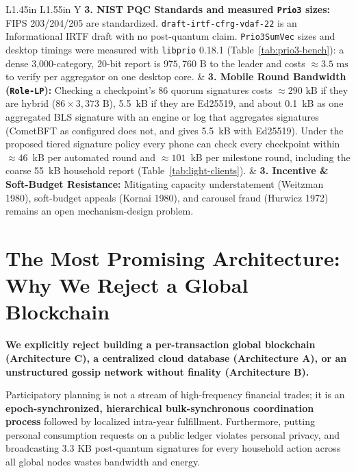 \documentclass[10pt,twoside,openany]{book}
\theoremstyle{dpepstyle}
\begin{document}
\begin{table}[htbp]
\begin{tabularx}{\textwidth}{L{1.45in} L{1.55in} Y}
\addlinespace[4pt]
\textbf{3. NIST PQC Standards and measured \texttt{Prio3} sizes:} FIPS 203/204/205 are standardized. \texttt{draft-irtf-cfrg-vdaf-22} is an Informational IRTF draft with no post-quantum claim. \texttt{Prio3SumVec} sizes and desktop timings were measured with \texttt{libprio} 0.18.1 (Table~\ref{tab:prio3-bench}): a dense 3,000-category, 20-bit report is $975{,}760\text{ B}$ to the leader and costs $\approx 3.5\text{ ms}$ to verify per aggregator on one desktop core. & \textbf{3. Mobile Round Bandwidth (\texttt{Role-LP}):} Checking a checkpoint's 86 quorum signatures costs $\approx 290\text{ kB}$ if they are hybrid ($86 \times 3{,}373\text{ B}$), 5.5~kB if they are Ed25519, and about 0.1~kB as one aggregated BLS signature with an engine or log that aggregates signatures (CometBFT as configured does not, and gives 5.5~kB with Ed25519). Under the proposed tiered signature policy every phone can check every checkpoint within $\approx 46$~kB per automated round and $\approx 101$~kB per milestone round, including the coarse 55~kB household report (Table~\ref{tab:light-clients}). & \textbf{3. Incentive \& Soft-Budget Resistance:} Mitigating capacity understatement (Weitzman 1980), soft-budget appeals (Kornai 1980), and carousel fraud (Hurwicz 1972) remains an open mechanism-design problem.\footnotemark \\
\bottomrule
\end{tabularx}
\end{table}
\addtocounter{footnote}{-1}

\section{The Most Promising Architecture: Why We Reject a Global Blockchain}
\label{sec:architecture-choice}

\textbf{We explicitly reject building a per-transaction global blockchain (Architecture C), a centralized cloud database (Architecture A), or an unstructured gossip network without finality (Architecture B).}

Participatory planning is not a stream of high-frequency financial trades; it is an \textbf{epoch-synchronized, hierarchical bulk-synchronous coordination process} followed by localized intra-year fulfillment. Furthermore, putting personal consumption requests on a public ledger violates personal privacy, and broadcasting $3.3\text{ KB}$ post-quantum signatures for every household action across all global nodes wastes bandwidth and energy.
\end{document}
